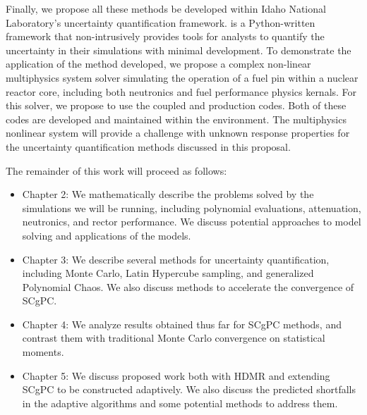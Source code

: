 Finally, we propose all these methods be developed within Idaho National Laboratory's \raven{}\cite{raven}
uncertainty quantification framework. \raven{} is a Python-written framework that non-intrusively provides
tools for analysts to quantify the uncertainty in their simulations with minimal development.  To demonstrate
the application of the method developed, we propose a complex non-linear multiphysics system solver simulating
the operation of a fuel pin within a nuclear reactor core, including both neutronics and fuel performance
physics kernals.  For this solver, we propose to use the coupled \rattlesnake{}\cite{rattlesnake} and 
\bison{} \cite{bison,mammoth} production codes.
Both of these codes are developed and maintained within the \moose{}\cite{moose} environment.  The
multiphysics nonlinear system will provide a challenge with unknown response properties for the uncertainty
quantification methods discussed in this proposal.

The remainder of this work will proceed as follows:
\begin{itemize}
  \item Chapter 2: We mathematically describe the problems solved by the simulations we will be running,
    including polynomial evaluations, attenuation,%
    neutronics, and rector performance.  We discuss
    potential approaches to model solving and applications of the models.
  \item Chapter 3: We describe several methods for uncertainty quantification, including Monte Carlo, Latin
    Hypercube sampling, and generalized Polynomial Chaos.  We also
    discuss methods to accelerate the convergence of SCgPC.
  \item Chapter 4: We analyze results obtained thus far for SCgPC methods, and contrast them with traditional
    Monte Carlo convergence on statistical moments.
  \item Chapter 5: We discuss proposed work both with HDMR and extending SCgPC to be constructed adaptively.  We
    also discuss the predicted shortfalls in the adaptive algorithms and some potential methods to address
    them.
\end{itemize}

